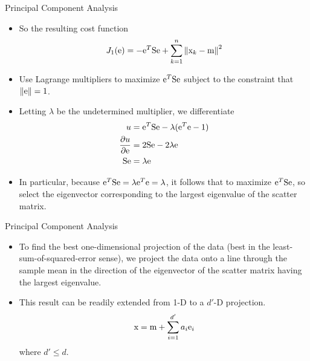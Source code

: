 \begin{frame}{Principal Component Analysis}
\begin{footnotesize}
\begin{itemize}
\item So the resulting cost function
\begin{equation}
{J_1}({\rm e}) =  - {{\rm e}^T}{\rm S}{\rm e} + \sum\limits_{k = 1}^n {{{\left\| {{{\rm x}_k} - {\rm m}} \right\|}^2}} \nonumber
\end{equation}
\item Use Lagrange multipliers to maximize ${\rm e}^T{\rm S}{\rm e}$ subject to the constraint that $\left\|{\rm e}\right\|=1$. 
\item Letting $\lambda$ be the undetermined multiplier, we differentiate
\begin{align}
u&={\rm e}^T{\rm S}{\rm e} -\lambda({\rm e}^T{\rm e}-1)\nonumber\\
\frac{{\partial u}}{{\partial {\rm e}}} &= 2{\rm S}{\rm e} - 2\lambda {\rm e}\nonumber\\
{\rm S}{\rm e}&=\lambda {\rm e}\nonumber
\end{align}
\item In particular, because ${\rm e}^T{\rm S}{\rm e}=\lambda {\rm e}^T{\rm e}=\lambda$, it follows that to maximize ${\rm e}^T{\rm S}{\rm e}$, so select the eigenvector corresponding to the largest eigenvalue of the scatter matrix.
\end{itemize}
\end{footnotesize}
\end{frame}

\begin{frame}{Principal Component Analysis}
\begin{itemize}
\setlength{\itemsep}{12pt}
\item To find the best one-dimensional projection of the data (best in the least-sum-of-squared-error sense), we project the data onto a line through the sample mean in the direction of the eigenvector of the scatter matrix having the largest eigenvalue.
\item This result can be readily extended from 1-D to a $d'$-D projection.
\begin{equation}
{\rm x} = {\rm m} + \sum\limits_{i = 1}^{{d'}} {{a_i}{{\rm e}_i}} \nonumber
\end{equation}
where $d'\leq d$.
\end{itemize}
\end{frame}

